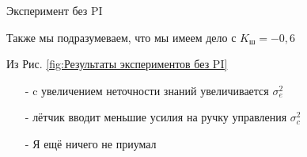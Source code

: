     \begin{center}
        Эксперимент без PI 
    \end{center}



    Также мы подразумеваем, что мы имеем дело с $K_\text{ш} = -0,6$

    Из Рис. {\ref{fig:Результаты экспериментов без PI}}
    \begin{itemize}
        \item [-] c увеличением неточности знаний увеличивается $\sigma_e^2$
        \item [-] лётчик вводит меньшие усилия на ручку управления $\sigma^2_c$ 
        \item [-]  Я ещё ничего не приумал   
    \end{itemize}